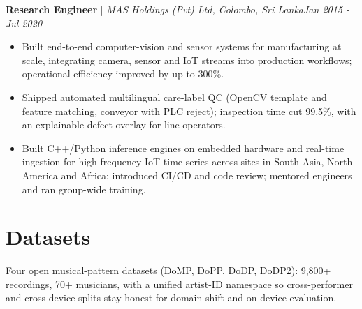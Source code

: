 \documentclass[11pt]{article}
\newenvironment{cvrole}[5]{%
  \par\noindent\textbf{\large #1} | \textit{\small #2, #3}\hfill \textit{\small #4 - #5}\par
  \begin{itemize}[leftmargin=2em, itemsep=-0.3em, topsep=-0.5em]%
}{%
  \end{itemize}\par\noindent\mbox{}\par\vspace{0.1em}%
}
\begin{document}
\begin{cvrole}{Research Engineer}{MAS Holdings (Pvt) Ltd}{Colombo, Sri Lanka}{Jan 2015}{Jul 2020}
    \item Built end-to-end computer-vision and sensor systems for manufacturing at scale, integrating camera, sensor and IoT streams into production workflows; operational efficiency improved by up to 300\%.
    \item Shipped automated multilingual care-label QC (OpenCV template and feature matching, conveyor with PLC reject); inspection time cut 99.5\%, with an explainable defect overlay for line operators.
    \item Built C++/Python inference engines on embedded hardware and real-time ingestion for high-frequency IoT time-series across sites in South Asia, North America and Africa; introduced CI/CD and code review; mentored engineers and ran group-wide training.
\end{cvrole}

\section*{Datasets \footnotesize {}}
Four open musical-pattern datasets (DoMP, DoPP, DoDP, DoDP2): 9,800+ recordings, 70+ musicians, with a unified artist-ID namespace so cross-performer and cross-device splits stay honest for domain-shift and on-device evaluation.
\end{document}
